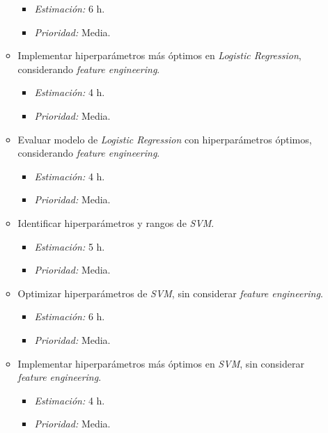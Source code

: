 \documentclass[
11pt, %
]{charter}
\begin{document}
\begin{itemize}
\begin{itemize}
                \begin{itemize}
                    \item \textit{Estimación:} 6 h.
                    \item \textit{Prioridad:} Media.
                \end{itemize}
            \item Implementar hiperparámetros más óptimos en \textit{Logistic Regression}, considerando \textit{feature engineering}.
                \begin{itemize}
                    \item \textit{Estimación:} 4 h.
                    \item \textit{Prioridad:} Media.
                \end{itemize}
            \item Evaluar modelo de \textit{Logistic Regression} con hiperparámetros óptimos, considerando \textit{feature engineering}.
                \begin{itemize}
                    \item \textit{Estimación:} 4 h.
                    \item \textit{Prioridad:} Media.
                \end{itemize}            
            \item Identificar hiperparámetros y rangos de \textit{SVM}.
                \begin{itemize}
                    \item \textit{Estimación:} 5 h.
                    \item \textit{Prioridad:} Media.
                \end{itemize}
            \item Optimizar hiperparámetros de \textit{SVM}, sin considerar \textit{feature engineering}.
                \begin{itemize}
                    \item \textit{Estimación:} 6 h.
                    \item \textit{Prioridad:} Media.
                \end{itemize}
            \item Implementar hiperparámetros más óptimos en \textit{SVM}, sin considerar \textit{feature engineering}.
                \begin{itemize}
                    \item \textit{Estimación:} 4 h.
                    \item \textit{Prioridad:} Media.

\end{itemize}
\end{itemize}
\end{itemize}
\end{document}
